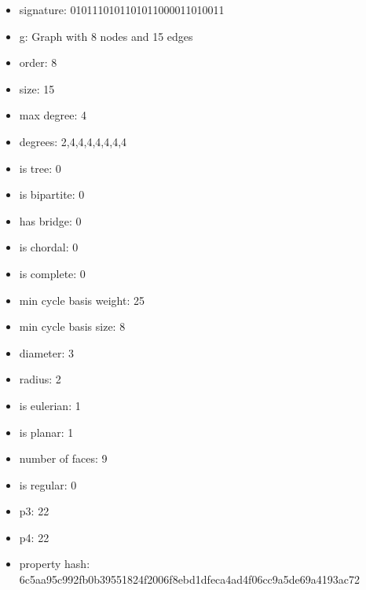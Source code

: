 \begin{itemize}
\item signature: 0101110101101011000011010011
\item g: Graph with 8 nodes and 15 edges
\item order: 8
\item size: 15
\item max degree: 4
\item degrees: 2,4,4,4,4,4,4,4
\item is tree: 0
\item is bipartite: 0
\item has bridge: 0
\item is chordal: 0
\item is complete: 0
\item min cycle basis weight: 25
\item min cycle basis size: 8
\item diameter: 3
\item radius: 2
\item is eulerian: 1
\item is planar: 1
\item number of faces: 9
\item is regular: 0
\item p3: 22
\item p4: 22
\item property hash: 6c5aa95c992fb0b39551824f2006f8ebd1dfeca4ad4f06cc9a5de69a4193ac72
\end{itemize}
\newpage
\begin{figure}
\end{figure}
